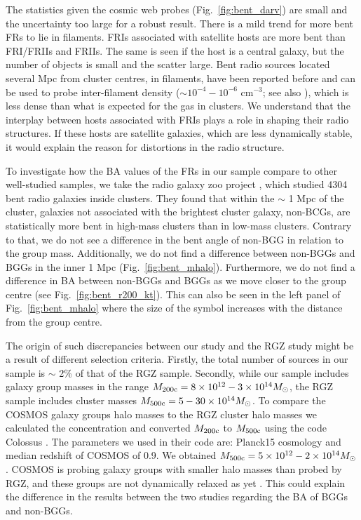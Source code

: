 \documentclass[galaxies,article,submit,moreauthors,pdftex]{Definitions/mdpi}
\begin{document}
The statistics given the cosmic web probes (Fig.~\ref{fig:bent_darv}) are small and the uncertainty too large for a robust result. There is a mild trend for more bent FRs to lie in filaments. FRIs associated with satellite hosts are more bent than FRI/FRIIs and FRIIs. The same is seen if the host is a central galaxy, but the number of objects is small and the scatter large. Bent radio sources located several Mpc from cluster centres, in filaments, have been reported before \citep{edwards10} and can be used to probe inter-filament density ($\sim 10^{-4}-10^{-6}$ cm$^{-3}$; see also \cite{plank13}), which is less dense than what is expected for the gas in clusters. We understand that the interplay between hosts associated with FRIs plays a role in shaping their radio structures. If these hosts are satellite galaxies, which are less dynamically stable, it would explain the reason for distortions in the radio structure.  


To investigate how the BA values of the FRs in our sample compare to other well-studied samples, we take the radio galaxy zoo project \citep[RGZ;][]{garon19}, which studied 4304 bent radio galaxies inside clusters. They found that within the $\sim$ 1 Mpc of the cluster, galaxies not associated with the brightest cluster galaxy, non-BCGs,  are statistically more bent in high-mass clusters than in low-mass clusters. Contrary to that, we do not see a difference in the bent angle of non-BGG in relation to the group mass. Additionally, we do not find a difference between non-BGGs and BGGs in the inner 1 Mpc (Fig.~\ref{fig:bent_mhalo}). Furthermore, we do not find a difference in BA between non-BGGs and BGGs as we move closer to the group centre (see Fig.~\ref{fig:bent_r200_kt}). This can also be seen in the left panel of Fig.~\ref{fig:bent_mhalo} where the size of the symbol increases with the distance from the group centre.

The origin of such discrepancies between our study and the RGZ study might be a result of different selection criteria. Firstly, the total number of sources in our sample is $\sim$ 2\% of that of the RGZ sample. Secondly, while our sample includes galaxy group masses in the range $M_{\rm 200c} = 8 \times 10^{12} - 3 \times 10^{14} M_{\odot}$, the RGZ sample includes cluster masses $M_{\rm 500c} = 5 - 30 \times 10^{14} M_{\odot}$. To compare the COSMOS galaxy groups halo masses to the RGZ cluster halo masses we calculated the concentration and converted $M_{\rm 200c}$ to $M_{\rm 500c}$ using the code Colossus \citep{diemer18}. The parameters we used in their code are: Planck15 cosmology and median redshift of COSMOS of 0.9. We obtained $M_{\rm 500c} = 5 \times 10^{12} - 2 \times 10^{14} M_{\odot}$. COSMOS is probing galaxy groups with smaller halo masses than probed by RGZ, and these groups are not dynamically relaxed as yet \cite{vardoulaki21}. This could explain the difference in the results between the two studies regarding the BA of BGGs and non-BGGs.
\end{document}
